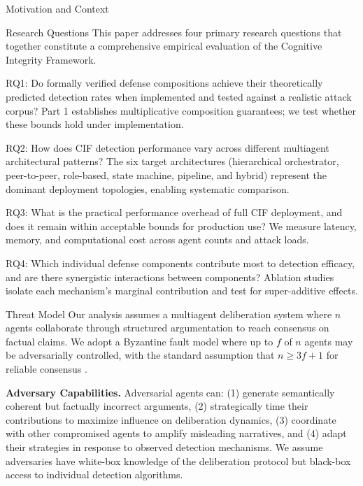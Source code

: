 \documentclass[
  ignorenonframetext,
]{beamer}
\begin{document}
\begin{frame}{Motivation and Context}
\begin{block}{Research Questions}
\protect{}\label{research-questions}
This paper addresses four primary research questions that together
constitute a comprehensive empirical evaluation of the Cognitive
Integrity Framework.

RQ1: Do formally verified defense compositions achieve their
theoretically predicted detection rates when implemented and tested
against a realistic attack corpus? Part 1 establishes multiplicative
composition guarantees; we test whether these bounds hold under
implementation.

RQ2: How does CIF detection performance vary across different multiagent
architectural patterns? The six target architectures (hierarchical
orchestrator, peer-to-peer, role-based, state machine, pipeline, and
hybrid) represent the dominant deployment topologies, enabling
systematic comparison.

RQ3: What is the practical performance overhead of full CIF deployment,
and does it remain within acceptable bounds for production use? We
measure latency, memory, and computational cost across agent counts and
attack loads.

RQ4: Which individual defense components contribute most to detection
efficacy, and are there synergistic interactions between components?
Ablation studies isolate each mechanism's marginal contribution and test
for super-additive effects.
\end{block}

\begin{block}{Threat Model}
\protect{}\label{threat-model}
Our analysis assumes a multiagent deliberation system where \(n\) agents
collaborate through structured argumentation to reach consensus on
factual claims. We adopt a Byzantine fault model where up to \(f\) of
\(n\) agents may be adversarially controlled, with the standard
assumption that \(n \geq 3f + 1\) for reliable consensus
\cite{lamport1982byzantine}.

\textbf{Adversary Capabilities.} Adversarial agents can: (1) generate
semantically coherent but factually incorrect arguments, (2)
strategically time their contributions to maximize influence on
deliberation dynamics, (3) coordinate with other compromised agents to
amplify misleading narratives, and (4) adapt their strategies in
response to observed detection mechanisms. We assume adversaries have
white-box knowledge of the deliberation protocol but black-box access to
individual detection algorithms.


\end{block}
\end{frame}
\end{document}
